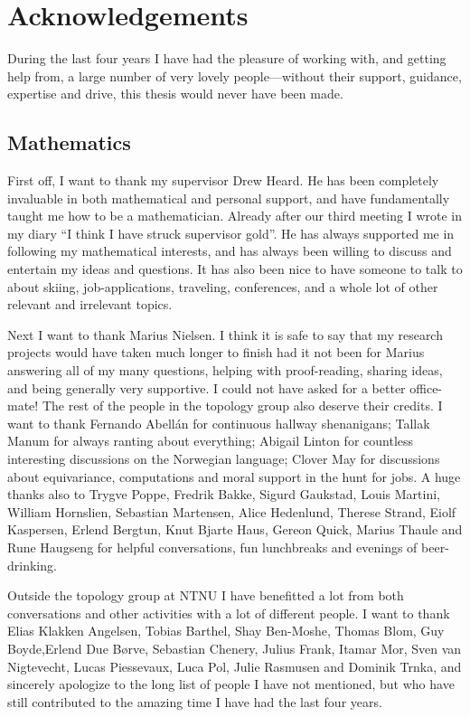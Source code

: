 
\section*{Acknowledgements}

During the last four years I have had the pleasure of working with, and getting help from, a large number of very lovely people---without their support, guidance, expertise and drive, this thesis would never have been made. 

\subsection*{Mathematics}

First off, I want to thank my supervisor Drew Heard. He has been completely invaluable in both mathematical and personal support, and have fundamentally taught me how to be a mathematician. Already after our third meeting I wrote in my diary ``I think I have struck supervisor gold''. He has always supported me in following my mathematical interests, and has always been willing to discuss and entertain my ideas and questions. It has also been nice to have someone to talk to about skiing, job-applications, traveling, conferences, and a whole lot of other relevant and irrelevant topics. 

Next I want to thank Marius Nielsen. I think it is safe to say that my research projects would have taken much longer to finish had it not been for Marius answering all of my many questions, helping with proof-reading, sharing ideas, and being generally very supportive. I could not have asked for a better office-mate! The rest of the people in the topology group also deserve their credits. I want to thank Fernando Abellán for continuous hallway shenanigans; Tallak Manum for always ranting about everything; Abigail Linton for countless interesting discussions on the Norwegian language; Clover May for discussions about equivariance, computations and moral support in the hunt for jobs. A huge thanks also to Trygve Poppe, Fredrik Bakke, Sigurd Gaukstad, Louis Martini, William Hornslien, Sebastian Martensen, Alice Hedenlund, Therese Strand, Eiolf Kaspersen, Erlend Bergtun, Knut Bjarte Haus, Gereon Quick, Marius Thaule and Rune Haugseng for helpful conversations, fun lunchbreaks and evenings of beer-drinking.

Outside the topology group at NTNU I have benefitted a lot from both conversations and other activities with a lot of different people. I want to thank Elias Klakken Angelsen, Tobias Barthel, Shay Ben-Moshe, Thomas Blom, Guy Boyde,Erlend Due Børve, Sebastian Chenery, Julius Frank, Itamar Mor, Sven van Nigtevecht, Lucas Piessevaux, Luca Pol, Julie Rasmusen and Dominik Trnka, 
and sincerely apologize to the long list of people I have not mentioned, but who have still contributed to the amazing time I have had the last four years. 

